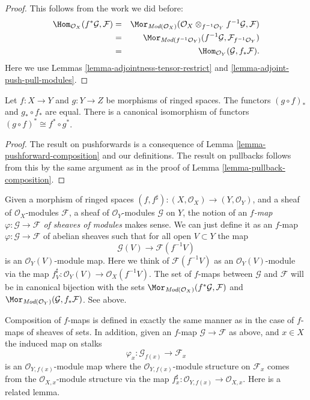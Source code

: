 \begin{proof}
This follows from the work we did before:
\begin{eqnarray*}
\Hom_{\mathcal{O}_X}(f^*\mathcal{G}, \mathcal{F})
& = &
\Mor_{\textit{Mod}(\mathcal{O}_X)}(
\mathcal{O}_X \otimes_{f^{-1}\mathcal{O}_Y} f^{-1}\mathcal{G}, \mathcal{F}) \\
& = &
\Mor_{\textit{Mod}(f^{-1}\mathcal{O}_Y)}(
f^{-1}\mathcal{G}, \mathcal{F}_{f^{-1}\mathcal{O}_Y}) \\
& = &
\Hom_{\mathcal{O}_Y}(\mathcal{G}, f_*\mathcal{F}).
\end{eqnarray*}
Here we use Lemmas \ref{lemma-adjointness-tensor-restrict}
and \ref{lemma-adjoint-push-pull-modules}.
\end{proof}

\begin{lemma}
\label{lemma-push-pull-composition-modules}
Let $f : X \to Y$ and $g : Y \to Z$ be morphisms of ringed spaces.
The functors $(g \circ f)_*$ and $g_* \circ f_*$ are equal.
There is a canonical isomorphism of functors
$(g \circ f)^* \cong f^* \circ g^*$.
\end{lemma}

\begin{proof}
The result on pushforwards is a consequence of Lemma
\ref{lemma-pushforward-composition} and our definitions.
The result on pullbacks follows from this by the same
argument as in the proof of Lemma \ref{lemma-pullback-composition}.
\end{proof}


\noindent
Given a morphism of ringed spaces
$(f, f^\sharp) : (X, \mathcal{O}_X) \to (Y, \mathcal{O}_Y)$,
and a sheaf of $\mathcal{O}_X$-modules $\mathcal{F}$,
a sheaf of $\mathcal{O}_Y$-modules $\mathcal{G}$ on $Y$,
the notion of an {\it $f$-map $\varphi : \mathcal{G} \to \mathcal{F}$
of sheaves of modules} makes sense. We can just define
it as an $f$-map $\varphi : \mathcal{G} \to \mathcal{F}$
of abelian sheaves such that for all open $V \subset Y$ the map
$$
\mathcal{G}(V) \longrightarrow \mathcal{F}(f^{-1}V)
$$
is an $\mathcal{O}_Y(V)$-module map. Here we think of
$\mathcal{F}(f^{-1}V)$ as an $\mathcal{O}_Y(V)$-module
via the map $f^\sharp_V : \mathcal{O}_Y(V) \to \mathcal{O}_X(f^{-1}V)$.
The set of $f$-maps between
$\mathcal{G}$ and $\mathcal{F}$ will be in canonical bijection
with the sets
$\Mor_{\textit{Mod}(\mathcal{O}_X)}(f^*\mathcal{G}, \mathcal{F})$
and
$\Mor_{\textit{Mod}(\mathcal{O}_Y)}(\mathcal{G}, f_*\mathcal{F})$.
See above.

\medskip\noindent
Composition of $f$-maps is defined in exactly the
same manner as in the case of $f$-maps of sheaves of
sets. In addition, given an $f$-map $\mathcal{G} \to \mathcal{F}$
as above, and $x \in X$ the induced map on stalks
$$
\varphi_x : \mathcal{G}_{f(x)} \longrightarrow \mathcal{F}_x
$$
is an $\mathcal{O}_{Y, f(x)}$-module map where the
$\mathcal{O}_{Y, f(x)}$-module structure on $\mathcal{F}_x$
comes from the $\mathcal{O}_{X, x}$-module structure via
the map $f^\sharp_x : \mathcal{O}_{Y, f(x)} \to \mathcal{O}_{X, x}$.
Here is a related lemma.

